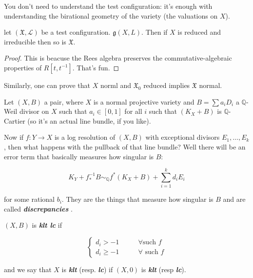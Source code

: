 \medskip{}
You don't need to understand the test
configuration: it's enough with understanding
the birational geometry of the variety (the
valuations on $X$).

\begin{corollary}
\label{corollary-montero-1}
let $(\mathfrak{X},\mathcal{L})$ be a test
configuration. $\mathfrak{g}(X,L)$. Then  if
$X$ is reduced and irreducible then so is
$\mathfrak{X}$.
\end{corollary}

\begin{proof}
This is beacuse the Rees algebra preserves
the commutative-algebraic properties of
$R[t,t^{-1}]$. That's fun.
\end{proof}

\begin{remark}
\label{remark-montero-3}
Similarly, one can prove that $X$ norml and
$\mathfrak{X}_0$ reduced implies
$\mathfrak{X}$ normal.
\end{remark}

\medskip{}

Let $(X,B)$ a pair, where $X$ is a normal
projective variety and $B=\sum a_i D_i$ a
$\mathbb{Q}$-Weil divisor on $X$ such that $
a_i \in [0,1]$ for all $i$ such that
$(K_X+B)$ is $\mathbb{Q}$-Cartier (so it's an
actual line bundle, if you like).

Now if $ f:Y \to X$ is a log resolution of
$(X,B)$ with exceptional divisors
$E_1,\ldots,E_k$, then what happens with the
pullback of that line bundle? Well there will
be an error term that basically measures how
singular is $B$:

$$
K_Y+f^{-1}_*B \sim_\mathbb{Q} f^*
(K_X+B)+\sum_{i=1}^k d_i E_i
$$

for some rational $b_i$. They are the things
that measure how singular is $B$ and are
called \textit{\textbf{discrepancies} }.

\begin{definition}
\label{definition-montero-2}
$(X,B)$ is \textit{\textbf{klt lc}} if

$$
\begin{cases}
d_i>-1\qquad &\forall \text{such $f$}  \\
d_i \geq -1\qquad &\forall \text{ such $f$}
\end{cases}
$$

and we say that $X$ is \textit{\textbf{klt}}
(resp. \textit{\textbf{lc}}) if $(X,0)$ is
\textit{\textbf{klt}} (resp
\textit{\textbf{lc}}).
\end{definition}

